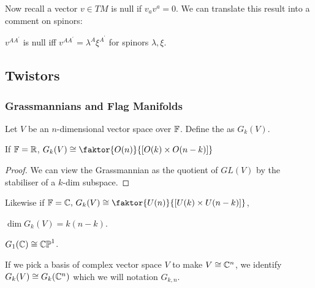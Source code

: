 \documentclass{article}
\begin{document}
Now recall a vector $v \in TM$ is null if $v_a v^a=0$. We can translate this result into a comment on spinors:
\begin{prop}
	$v^{AA^\prime}$ is null iff $v^{AA^\prime} = \lambda^A \xi^{A^\prime}$ for spinors $\lambda, \xi$. 
\end{prop}
\subsection{Twistors}
\subsubsection{Grassmannians and Flag Manifolds}
\begin{definition}
	Let $V$ be an $n$-dimensional vector space over $\mathbb{F}$. Define the  as $G_k(V)$. 
\end{definition}

\begin{lemma}
	If $\mathbb{F}= \mathbb{R}$, $G_k(V)\cong \faktor{O(n)}{[O(k) \times O(n-k)]}$
\end{lemma}
\begin{proof}
	We can view the Grassmannian as the quotient of $GL(V)$ by the stabiliser of a $k$-dim subspace. 
\end{proof}
\begin{remark}
	Likewise if $\mbb{F}=\mbb{C}, \, G_k(V) \cong \faktor{U(n)}{[U(k) \times U(n-k)]}$,
\end{remark}
\begin{corollary}
	$\dim G_k(V) = k(n-k)$. 
\end{corollary}

\begin{example} 
	$G_1(\mathbb{C}) \cong \mathbb{CP}^1$. 
\end{example}

\begin{notation}
	If we pick a basis of complex vector space $V$ to make $V \cong \mathbb{C}^n$, we identify $G_k(V) \cong G_k(\mathbb{C}^n)$ which we will notation $G_{k,n}$. 
\end{notation}
\end{document}
